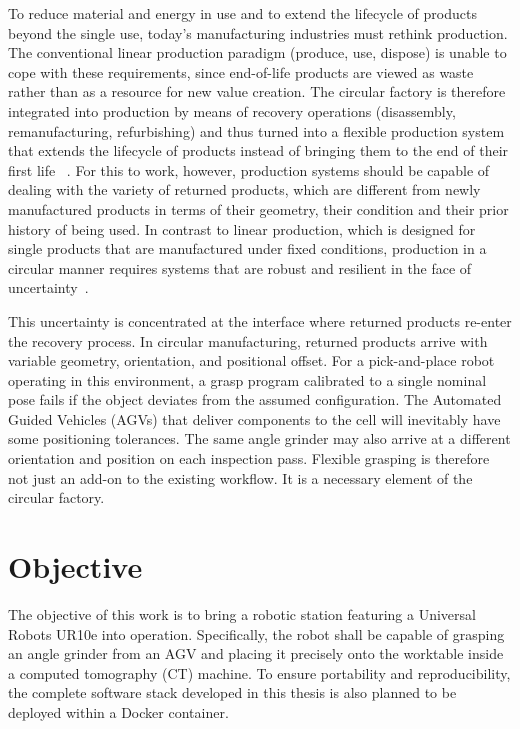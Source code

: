 \documentclass[oneside,studentpaper]{wbk}
\begin{document}
To reduce material and energy in use and to extend the lifecycle of products beyond the single use, today’s manufacturing industries must rethink production. The conventional linear production paradigm (produce, use, dispose) is unable to cope with these requirements, since end-of-life products are viewed as waste rather than as a resource for new value creation. The circular factory is therefore integrated into production by means of recovery operations (disassembly, remanufacturing, refurbishing) and thus turned into a flexible production system that extends the lifecycle of products instead of bringing them to the end of their first life ~\cite{lanza2024vision}. For this to work, however, production systems should be capable of dealing with the variety of returned products, which are different from newly manufactured products in terms of their geometry, their condition and their prior history of being used. In contrast to linear production, which is designed for single products that are manufactured under fixed conditions, production in a circular manner requires systems that are robust and resilient in the face of uncertainty~\cite{bail2025circular}.

This uncertainty is concentrated at the interface where returned products re-enter the recovery process. In circular manufacturing, returned products arrive with variable geometry, orientation, and positional offset. For a pick-and-place robot operating in this environment, a grasp program calibrated to a single nominal pose fails if the object deviates from the assumed configuration. The Automated Guided Vehicles (AGVs) that deliver components to the cell will inevitably have some positioning tolerances. The same angle grinder may also arrive at a different orientation and position on each inspection pass. Flexible grasping is therefore not just an add-on to the existing workflow. It is a necessary element of the circular factory.

\section{Objective}
\label{sec:objective}

The objective of this work is to bring a robotic station featuring a Universal Robots UR10e into operation. Specifically, the robot shall be capable of grasping an angle grinder from an AGV and placing it precisely onto the worktable inside a computed tomography (CT) machine. To ensure portability and reproducibility, the complete software stack developed in this thesis is also planned to be deployed within a Docker container.
\end{document}
